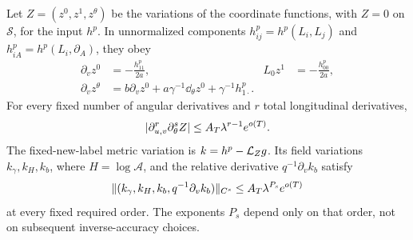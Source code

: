 \begin{lemma}\label{lem:packet-linear-gauge}
Let $Z=(z^0,z^1,z^\theta)$ be the variations of the coordinate
functions, with $Z=0$ on $\mathcal S$, for the input $h^p$.
In unnormalized components $h^p_{ij}=h^p(L_i,L_j)$ and
$h^p_{iA}=h^p(L_i,\partial_A)$, they obey
\begin{equation}\label{pk:linear-optical}
 \begin{aligned}
 \partial_vz^0&=-\frac{h^p_{11}}{2a},&
 L_0z^1&=-\frac{h^p_{00}}{2a},\\
 \partial_vz^\theta
 &=b\partial_vz^0+a\gamma^{-1}\dd_\theta z^0
                         +\gamma^{-1}h^p_{1\cdot}.
 \end{aligned}
\end{equation}
For every fixed number of angular derivatives and $r$ total
longitudinal derivatives,
\begin{equation}\label{pk:coordinate-gain}
 |\partial_{u,v}^{r}\partial_\theta^sZ|
                      \le A_T\lambda^{r-1}e^{o(T)}.
\end{equation}
The fixed-new-label metric variation is $k=h^p-\mathcal L_Zg$.
Its field variations $k_\gamma,k_H,k_b$, where $H=\log\mathcal A$,
and the relative derivative $q^{-1}\partial_vk_b$ satisfy
\begin{equation}\label{pk:relative-linear}
 \|(k_\gamma,k_H,k_b,q^{-1}\partial_vk_b)\|_{C^s}
                        \le A_T\lambda^{P_s}e^{o(T)}
\end{equation}
at every fixed required order. The exponents $P_s$ depend only on
that order, not on subsequent inverse-accuracy choices.
\end{lemma}

